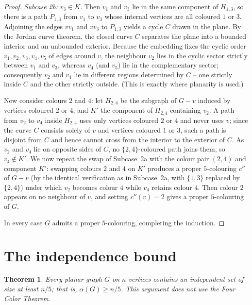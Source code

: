 \documentclass{amsart}
\newtheorem{theorem}{Theorem}
\theoremstyle{remark}
\begin{document}
\begin{proof}
\emph{Subcase 2b: $v_3\in K$.} Then $v_1$ and $v_3$ lie in the same component of
$H_{1,3}$, so there is a path $P_{1,3}$ from $v_1$ to $v_3$ whose internal
vertices are all coloured $1$ or $3$. Adjoining the edges $vv_1$ and $vv_3$ to
$P_{1,3}$ yields a cycle $C$ drawn in the plane. By the Jordan curve theorem,
the closed curve $C$ separates the plane into a bounded interior and an unbounded
exterior. Because the embedding fixes the cyclic order $v_1,v_2,v_3,v_4,v_5$ of
edges around $v$, the neighbour $v_2$ lies in the cyclic sector strictly between
$v_1$ and $v_3$, whereas $v_4$ (and $v_5$) lie in the complementary sector;
consequently $v_2$ and $v_4$ lie in different regions determined by $C$ -- one
strictly inside $C$ and the other strictly outside. (This is exactly where
planarity is used.)

Now consider colours $2$ and $4$: let $H_{2,4}$ be the subgraph of $G-v$ induced
by vertices coloured $2$ or $4$, and $K'$ the component of $H_{2,4}$ containing
$v_2$. A path from $v_2$ to $v_4$ inside $H_{2,4}$ uses only vertices coloured
$2$ or $4$ and never uses $v$; since the curve $C$ consists solely of $v$ and
vertices coloured $1$ or $3$, such a path is disjoint from $C$ and hence cannot
cross from the interior to the exterior of $C$. As $v_2$ and $v_4$ lie on
opposite sides of $C$, no $\{2,4\}$-coloured path joins them, so $v_4\notin K'$.
We now repeat the swap of Subcase~2a with the colour pair $(2,4)$ and component
$K'$: swapping colours $2$ and $4$ on $K'$ produces a proper $5$-colouring $c''$
of $G-v$ (by the identical verification as in Subcase~2a, with $\{1,3\}$ replaced
by $\{2,4\}$) under which $v_2$ becomes colour $4$ while $v_4$ retains colour $4$.
Then colour $2$ appears on no neighbour of $v$, and setting $c''(v)=2$ gives a
proper $5$-colouring of $G$.

In every case $G$ admits a proper $5$-colouring, completing the induction.
\end{proof}

\section{The independence bound}

\begin{theorem}\label{thm:main}
Every planar graph $G$ on $n$ vertices contains an independent set of size at
least $n/5$; that is, $\alpha(G)\ge n/5$. This argument does not use the Four
Color Theorem.
\end{theorem}
\end{document}
